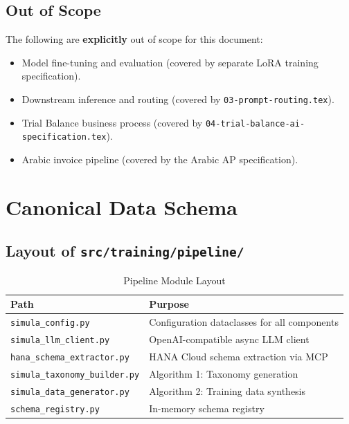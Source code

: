 \documentclass[11pt,a4paper]{article}
\begin{document}
\subsection{Out of Scope}

The following are \textbf{explicitly} out of scope for this document:

\begin{itemize}[nosep]
    \item Model fine-tuning and evaluation (covered by separate LoRA training specification).
    \item Downstream inference and routing (covered by \texttt{03-prompt-routing.tex}).
    \item Trial Balance business process (covered by \texttt{04-trial-balance-ai-specification.tex}).
    \item Arabic invoice pipeline (covered by the Arabic AP specification).
\end{itemize}

\newpage
\section{Canonical Data Schema}
\label{chap:schema}

\subsection{Layout of \texttt{src/training/pipeline/}}

\begin{table}[H]
\centering
\caption{Pipeline Module Layout}
\label{tab:module-layout}
\begin{tabularx}{\textwidth}{lX}
\toprule
\textbf{Path} & \textbf{Purpose} \\
\midrule
\texttt{simula\_config.py} & Configuration dataclasses for all components \\
\texttt{simula\_llm\_client.py} & OpenAI-compatible async LLM client \\
\texttt{hana\_schema\_extractor.py} & HANA Cloud schema extraction via MCP \\
\texttt{simula\_taxonomy\_builder.py} & Algorithm 1: Taxonomy generation \\
\texttt{simula\_data\_generator.py} & Algorithm 2: Training data synthesis \\
\texttt{schema\_registry.py} & In-memory schema registry \\
\bottomrule
\end{tabularx}
\end{table}
\end{document}
